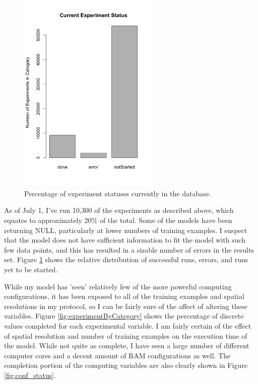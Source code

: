 \documentclass[a4paper]{article}
\begin{document}
\begin{figure}
\centering
\includegraphics[width=0.6\textwidth]{experimentByCategory.png}
\caption{\label{fig:completionByCategory}Percentage of experiment statuses currently in the database. }
\end{figure}

As of July 1, I've run 10,300 of the experiments as described above, which equates to approximately 20\% of the total.  Some of the models have been returning NULL, particularly at lower numbers of training examples.  I suspect that the model does not have sufficient information to fit the model with such few data points, and this has resulted in a sizable number of errors in the results set.  Figure \ref{fig:completionByCategory} shows the relative distribution of successful runs, errors, and runs yet to be started.  

While my model has 'seen' relatively few of the more powerful computing configurations, it has been exposed to all of the training examples and spatial resolutions in my protocol, so I can be fairly sure of the affect of altering these variables. Figure \ref{fig:experimentByCategory} shows the percentage of discrete values completed for each experimental variable.  I am fairly certain of the effect of spatial resolution and number of training examples on the execution time of the model.  While not quite as complete, I have seen a large number of different computer cores and a decent amount of RAM configurations as well.  The completion portion of the computing variables are also clearly shown in Figure \ref{fig:conf_status}.
\end{document}
